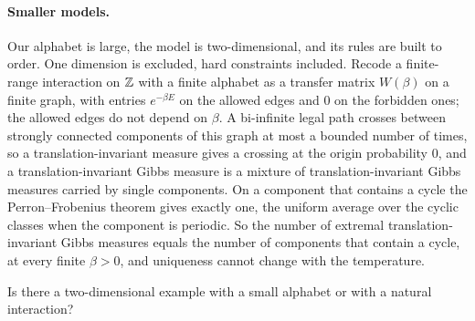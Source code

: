 \paragraph{Smaller models.} Our alphabet is large, the model is two-dimensional, and its rules are built to order. One dimension is excluded, hard constraints included. Recode a finite-range interaction on $\mathbb{Z}$ with a finite alphabet as a transfer matrix $W(\beta)$ on a finite graph, with entries $e^{-\beta E}$ on the allowed edges and $0$ on the forbidden ones; the allowed edges do not depend on $\beta$. A bi-infinite legal path crosses between strongly connected components of this graph at most a bounded number of times, so a translation-invariant measure gives a crossing at the origin probability $0$, and a translation-invariant Gibbs measure is a mixture of translation-invariant Gibbs measures carried by single components. On a component that contains a cycle the Perron--Frobenius theorem gives exactly one, the uniform average over the cyclic classes when the component is periodic. So the number of extremal translation-invariant Gibbs measures equals the number of components that contain a cycle, at every finite $\beta>0$, and uniqueness cannot change with the temperature.

\begin{problem}\label{prob:small}
Is there a two-dimensional example with a small alphabet or with a natural interaction?
\end{problem}
